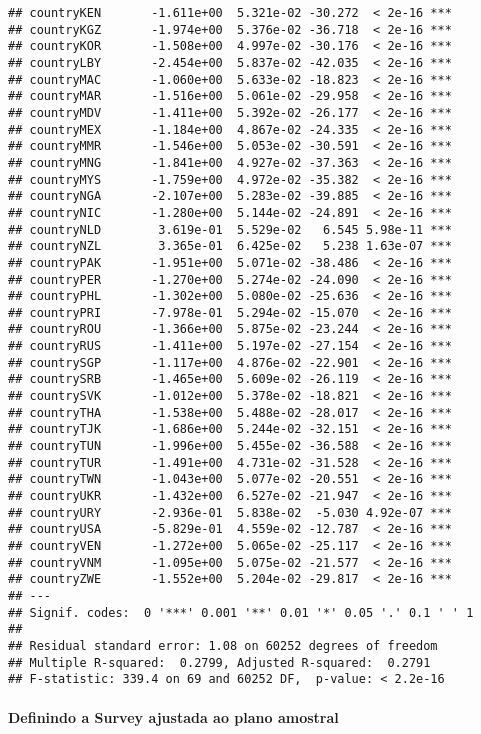 \documentclass[
]{article}
\begin{document}
\begin{verbatim}
## countryKEN       -1.611e+00  5.321e-02 -30.272  < 2e-16 ***
## countryKGZ       -1.974e+00  5.376e-02 -36.718  < 2e-16 ***
## countryKOR       -1.508e+00  4.997e-02 -30.176  < 2e-16 ***
## countryLBY       -2.454e+00  5.837e-02 -42.035  < 2e-16 ***
## countryMAC       -1.060e+00  5.633e-02 -18.823  < 2e-16 ***
## countryMAR       -1.516e+00  5.061e-02 -29.958  < 2e-16 ***
## countryMDV       -1.411e+00  5.392e-02 -26.177  < 2e-16 ***
## countryMEX       -1.184e+00  4.867e-02 -24.335  < 2e-16 ***
## countryMMR       -1.546e+00  5.053e-02 -30.591  < 2e-16 ***
## countryMNG       -1.841e+00  4.927e-02 -37.363  < 2e-16 ***
## countryMYS       -1.759e+00  4.972e-02 -35.382  < 2e-16 ***
## countryNGA       -2.107e+00  5.283e-02 -39.885  < 2e-16 ***
## countryNIC       -1.280e+00  5.144e-02 -24.891  < 2e-16 ***
## countryNLD        3.619e-01  5.529e-02   6.545 5.98e-11 ***
## countryNZL        3.365e-01  6.425e-02   5.238 1.63e-07 ***
## countryPAK       -1.951e+00  5.071e-02 -38.486  < 2e-16 ***
## countryPER       -1.270e+00  5.274e-02 -24.090  < 2e-16 ***
## countryPHL       -1.302e+00  5.080e-02 -25.636  < 2e-16 ***
## countryPRI       -7.978e-01  5.294e-02 -15.070  < 2e-16 ***
## countryROU       -1.366e+00  5.875e-02 -23.244  < 2e-16 ***
## countryRUS       -1.411e+00  5.197e-02 -27.154  < 2e-16 ***
## countrySGP       -1.117e+00  4.876e-02 -22.901  < 2e-16 ***
## countrySRB       -1.465e+00  5.609e-02 -26.119  < 2e-16 ***
## countrySVK       -1.012e+00  5.378e-02 -18.821  < 2e-16 ***
## countryTHA       -1.538e+00  5.488e-02 -28.017  < 2e-16 ***
## countryTJK       -1.686e+00  5.244e-02 -32.151  < 2e-16 ***
## countryTUN       -1.996e+00  5.455e-02 -36.588  < 2e-16 ***
## countryTUR       -1.491e+00  4.731e-02 -31.528  < 2e-16 ***
## countryTWN       -1.043e+00  5.077e-02 -20.551  < 2e-16 ***
## countryUKR       -1.432e+00  6.527e-02 -21.947  < 2e-16 ***
## countryURY       -2.936e-01  5.838e-02  -5.030 4.92e-07 ***
## countryUSA       -5.829e-01  4.559e-02 -12.787  < 2e-16 ***
## countryVEN       -1.272e+00  5.065e-02 -25.117  < 2e-16 ***
## countryVNM       -1.095e+00  5.075e-02 -21.577  < 2e-16 ***
## countryZWE       -1.552e+00  5.204e-02 -29.817  < 2e-16 ***
## ---
## Signif. codes:  0 '***' 0.001 '**' 0.01 '*' 0.05 '.' 0.1 ' ' 1
## 
## Residual standard error: 1.08 on 60252 degrees of freedom
## Multiple R-squared:  0.2799, Adjusted R-squared:  0.2791 
## F-statistic: 339.4 on 69 and 60252 DF,  p-value: < 2.2e-16
\end{verbatim}

\hypertarget{definindo-a-survey-ajustada-ao-plano-amostral}{%
\paragraph{Definindo a Survey ajustada ao plano
amostral}\label{definindo-a-survey-ajustada-ao-plano-amostral}}
\end{document}
